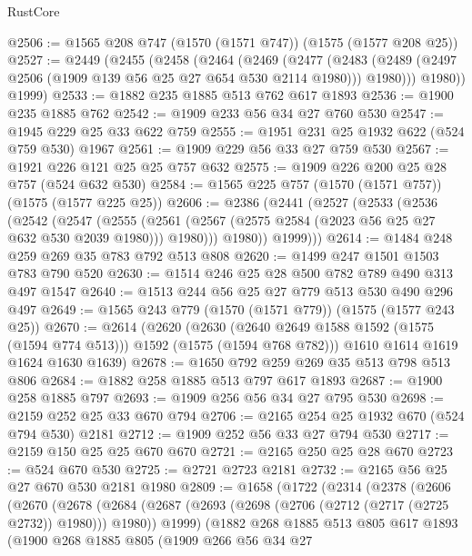 \begin{lexlean}{RustCore}
\begin{coremodule}
@2506 := @1565 @208 @747 (@1570 (@1571 @747)) (@1575 (@1577 @208 @25))
@2527 := @2449
    (@2455
      (@2458
        (@2464
          (@2469
            (@2477
              (@2483 (@2489 (@2497 @2506 (@1909 @139 @56 @25 @27 @654 @530 @2114 @1980))) @1980)))
          @1980))
      @1999)
@2533 := @1882 @235 @1885 @513 @762 @617 @1893
@2536 := @1900 @235 @1885 @762
@2542 := @1909 @233 @56 @34 @27 @760 @530
@2547 := @1945 @229 @25 @33 @622 @759
@2555 := @1951 @231 @25 @1932 @622 (@524 @759 @530) @1967
@2561 := @1909 @229 @56 @33 @27 @759 @530
@2567 := @1921 @226 @121 @25 @25 @757 @632
@2575 := @1909 @226 @200 @25 @28 @757 (@524 @632 @530)
@2584 := @1565 @225 @757 (@1570 (@1571 @757)) (@1575 (@1577 @225 @25))
@2606 := @2386
    (@2441
      (@2527
        (@2533
          (@2536
            (@2542
              (@2547
                (@2555
                  (@2561 (@2567 (@2575 @2584 (@2023 @56 @25 @27 @632 @530 @2039 @1980))) @1980)))
              @1980))
          @1999)))
@2614 := @1484 @248 @259 @269 @35 @783 @792 @513 @808
@2620 := @1499 @247 @1501 @1503 @783 @790 @520
@2630 := @1514 @246 @25 @28 @500 @782 @789 @490 @313 @497 @1547
@2640 := @1513 @244 @56 @25 @27 @779 @513 @530 @490 @296 @497
@2649 := @1565 @243 @779 (@1570 (@1571 @779)) (@1575 (@1577 @243 @25))
@2670 := @2614
    (@2620
      (@2630 (@2640 @2649 @1588 @1592 (@1575 (@1594 @774 @513))) @1592 (@1575 (@1594 @768 @782)))
      @1610
      @1614
      @1619
      @1624
      @1630
      @1639)
@2678 := @1650 @792 @259 @269 @35 @513 @798 @513 @806
@2684 := @1882 @258 @1885 @513 @797 @617 @1893
@2687 := @1900 @258 @1885 @797
@2693 := @1909 @256 @56 @34 @27 @795 @530
@2698 := @2159 @252 @25 @33 @670 @794
@2706 := @2165 @254 @25 @1932 @670 (@524 @794 @530) @2181
@2712 := @1909 @252 @56 @33 @27 @794 @530
@2717 := @2159 @150 @25 @25 @670 @670
@2721 := @2165 @250 @25 @28 @670
@2723 := @524 @670 @530
@2725 := @2721 @2723 @2181
@2732 := @2165 @56 @25 @27 @670 @530 @2181 @1980
@2809 := @1658
    (@1722
      (@2314
        (@2378
          (@2606
            (@2670
              (@2678
                (@2684
                  (@2687 (@2693 (@2698 (@2706 (@2712 (@2717 (@2725 @2732)) @1980))) @1980))
                  @1999)
                (@1882
                  @268
                  @1885
                  @513
                  @805
                  @617
                  @1893
                  (@1900
                    @268
                    @1885
                    @805
                    (@1909
                      @266
                      @56
                      @34
                      @27

\end{coremodule}
\end{lexlean}

